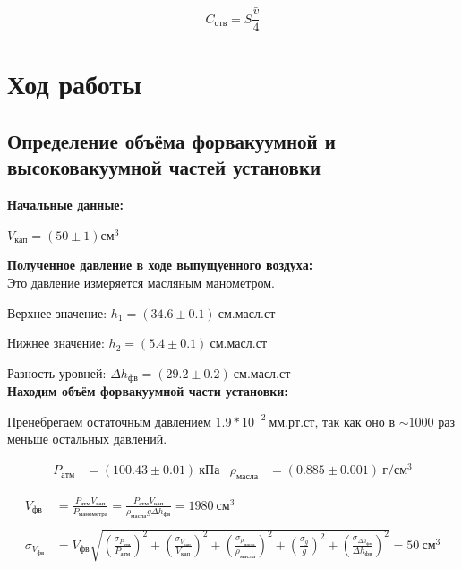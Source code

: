 \documentclass[a4paper, 12pt]{article}
\begin{document}
    \begin{equation}
    C_{отв}=S\frac{\bar v}{4}
    \end{equation}

    \section{Ход работы}
    \subsection{Определение объёма форвакуумной и высоковакуумной частей установки}
        
        \textbf{Начальные данные:}
        
            $V_{кап} = (50 \pm 1) см^3$ 
            
            \textbf{Полученное давление в ходе выпущуенного воздуха:} \\
       
            Это давление измеряется масляным манометром.

            Верхнее значение: $h_1 = (34.6 \pm 0.1)~см.масл.ст$

            Нижнее значение:  $h_2 = (5.4 \pm 0.1)~см.масл.ст$

            Разность уровней: $\Delta h_{фв} = (29.2 \pm 0.2)~см.масл.ст$ \\

        \textbf{Находим объём форвакуумной части установки:}

            Пренебрегаем остаточным давлением $1.9*10^{-2}~мм.рт.ст$, так как оно в $\sim1000$ раз меньше остальных давлений.

            \begin{align*}
                P_{атм} &= (100.43 \pm 0.01)~кПа & \rho_{масла} &= (0.885 \pm 0.001)~г/см^3
            \end{align*}

            \begin{align*}
                V_{фв} &= \frac{P_{атм} V_{кап}}{P_{манометра}} = \frac{P_{атм} V_{кап}}{\rho_{масла} g \Delta h_{фв}} = 1980~см^3\\\\
                \sigma_{V_{фв}} &= V_{фв} \sqrt{\left( \frac{\sigma_{P_{атм}}}{P_{атм}} \right)^2 + \left( \frac{\sigma_{V_{кап}}}{V_{кап}} \right)^2 + \left( \frac{\sigma_{\rho_{масла}}}{\rho_{масла}} \right)^2 + \left( \frac{\sigma_{g}}{g} \right)^2 + \left( \frac{\sigma_{\Delta h_{фв}}}{\Delta h_{фв}} \right)^2} = 50~см^3
            \end{align*} \\
\end{document}
